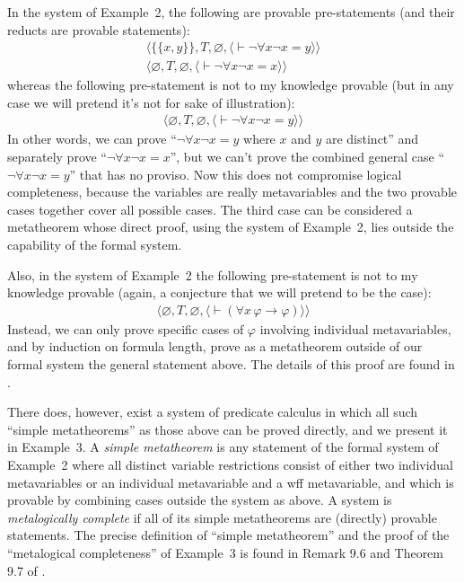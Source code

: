 In the system of Example~2, the
following are provable pre-statements (and their reducts are
provable statements):
\begin{eqnarray*}
      & \langle\{\{x,y\}\},T,\varnothing,
               \langle \vdash\lnot\forall x\lnot x=y
               \rangle\rangle & \\
     &  \langle\varnothing,T,\varnothing,
               \langle \vdash\lnot\forall x\lnot x=x
               \rangle\rangle &
\end{eqnarray*}
whereas the following pre-statement is not to my knowledge provable (but
in any case we will pretend it's not for sake of illustration):
\begin{eqnarray*}
     &  \langle\varnothing,T,\varnothing,
               \langle \vdash\lnot\forall x\lnot x=y
               \rangle\rangle &
\end{eqnarray*}
In other words, we can prove ``$\lnot\forall x\lnot x=y$ where $x$ and $y$ are
distinct'' and separately prove ``$\lnot\forall x\lnot x=x$'', but we can't
prove the combined general case ``$\lnot\forall x\lnot x=y$'' that has no
proviso.  Now this does not compromise logical completeness, because the
variables are really metavariables and the two provable cases together cover
all possible cases.  The third case can be considered a metatheorem whose
direct proof, using the system of Example~2, lies outside the capability of the
formal system.

Also, in the system of Example~2 the following pre-statement is not to my
knowledge provable (again, a conjecture that we will pretend to be the case):
\begin{eqnarray*}
     & \langle\varnothing,T,\varnothing,
               \langle \vdash(\forall x\, \varphi\to\varphi)
               \rangle\rangle &
\end{eqnarray*}
Instead, we can only prove specific cases of $\varphi$ involving individual
metavariables, and by induction on formula length, prove as a metatheorem
outside of our formal system the general statement above.  The details of this
proof are found in \cite{Kalish}.

There does, however, exist a system of predicate calculus in which all such
``simple metatheorems'' as those above can be proved directly, and we present
it in Example~3. A {\em simple metatheorem}
is any statement of the formal
system of Example~2 where all distinct variable restrictions consist of either
two individual metavariables or an individual metavariable and a wff
metavariable, and which is provable by combining cases outside the system as
above.  A system is {\em metalogically complete} if all of its simple
metatheorems are (directly) provable statements. The precise definition of
``simple metatheorem'' and the proof of the ``metalogical completeness'' of
Example~3 is found in Remark 9.6 and Theorem 9.7 of \cite{Megill}.

